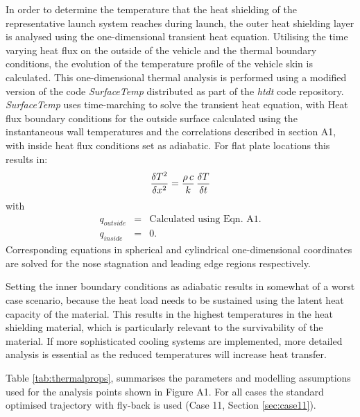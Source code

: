 In order to determine the temperature that the heat shielding of the representative launch system reaches during launch, the outer heat shielding layer is analysed using the one-dimensional transient heat equation. Utilising the time varying heat flux on the outside of the vehicle and the thermal boundary conditions, the evolution of the temperature profile of the vehicle skin is calculated. 
This one-dimensional thermal analysis is performed using a modified version of the code {\it SurfaceTemp} distributed as part of the {\it htdt} code repository\cite{htdt}. {\it SurfaceTemp} uses time-marching to solve the transient heat equation, with Heat flux boundary conditions for the outside surface calculated using the instantaneous wall temperatures and the correlations described in section A1, with inside heat flux conditions set as adiabatic. For flat plate locations this results in:  
\begin{equation}
\frac{\delta T^2}{\delta x^2} = \frac{\rho \, c}{k} \, \frac{\delta T}{\delta t} \\
\end{equation}
with
\begin{eqnarray}
q_{outside} &=& \text{Calculated using Eqn. A1.} \\
q_{inside} &=& 0. 
\end{eqnarray}
Corresponding equations in spherical and cylindrical one-dimensional coordinates are solved for the nose stagnation and leading edge regions respectively. 

Setting the inner boundary conditions as adiabatic results in somewhat of a worst case scenario, because the heat load needs to be sustained using the latent heat capacity of the material. This results in the highest temperatures in the heat shielding material, which is particularly relevant to the survivability of the material. If more sophisticated cooling systems are implemented, more detailed analysis is essential as the reduced temperatures will increase heat transfer. 

Table \ref{tab:thermalprops}, summarises the parameters and modelling assumptions used for the analysis points shown in Figure A1. For all cases the standard optimised trajectory with fly-back is used (Case 11, Section \ref{sec:case11}). 

